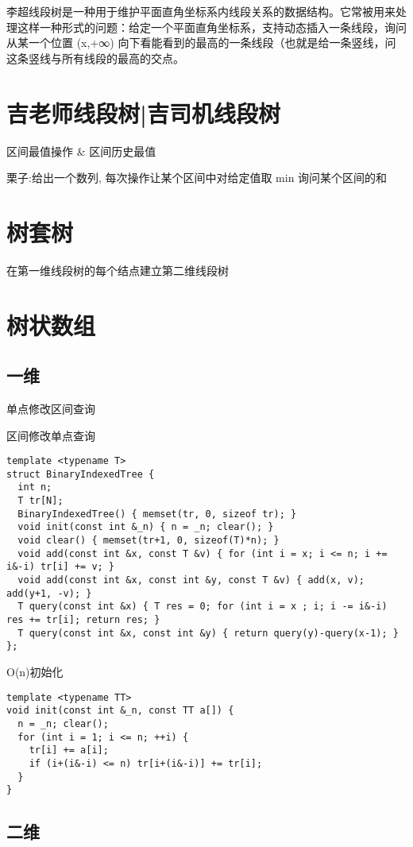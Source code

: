 \documentclass[12pt]{article}
\begin{document}
{{{{{{{{{{{{{{{{李超线段树是一种用于维护平面直角坐标系内线段关系的数据结构。它常被用来处理这样一种形式的问题：给定一个平面直角坐标系，支持动态插入一条线段，询问从某一个位置 (x,+∞) 向下看能看到的最高的一条线段（也就是给一条竖线，问这条竖线与所有线段的最高的交点。

\section{吉老师线段树|吉司机线段树}

区间最值操作 \& 区间历史最值

栗子:给出一个数列, 每次操作让某个区间中对给定值取 min 询问某个区间的和

\section{树套树}

在第一维线段树的每个结点建立第二维线段树

\section{树状数组}
\subsection{一维}
单点修改区间查询

区间修改单点查询

{\setmainfont{Consolas}
\begin{lstlisting}
template <typename T>
struct BinaryIndexedTree {
  int n;
  T tr[N];
  BinaryIndexedTree() { memset(tr, 0, sizeof tr); }
  void init(const int &_n) { n = _n; clear(); }
  void clear() { memset(tr+1, 0, sizeof(T)*n); }
  void add(const int &x, const T &v) { for (int i = x; i <= n; i += i&-i) tr[i] += v; }
  void add(const int &x, const int &y, const T &v) { add(x, v); add(y+1, -v); }
  T query(const int &x) { T res = 0; for (int i = x ; i; i -= i&-i) res += tr[i]; return res; }
  T query(const int &x, const int &y) { return query(y)-query(x-1); }
};
\end{lstlisting}

O(n)初始化
{\setmainfont{Consolas}
\begin{lstlisting}
template <typename TT>
void init(const int &_n, const TT a[]) {
  n = _n; clear();
  for (int i = 1; i <= n; ++i) {
    tr[i] += a[i];
    if (i+(i&-i) <= n) tr[i+(i&-i)] += tr[i];
  }
}
\end{lstlisting}
\subsection{二维}
}}}}}}}}}}}}}}}}}}
\end{document}
